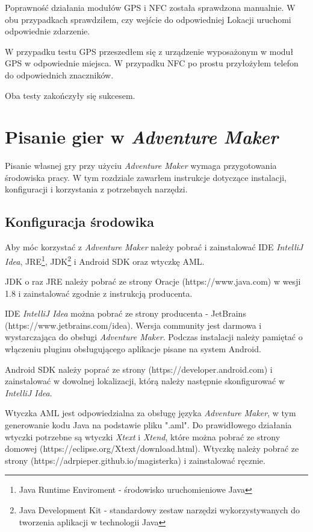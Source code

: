 \documentclass[openright]{xmgr}
\begin{document}
Poprawność działania modułów GPS i NFC została sprawdzona manualnie. W obu przypadkach sprawdziłem, czy wejście do odpowiedniej Lokacji uruchomi odpowiednie zdarzenie.

W przypadku testu GPS przeszedłem się z urządzenie wyposażonym w moduł GPS w odpowiednie miejsca. W przypadku NFC po prostu przyłożyłem telefon do odpowiednich znaczników. 

Oba testy zakończyły się sukcesem.  

\chapter{Pisanie gier w \textit{Adventure Maker}}
Pisanie własnej gry przy użyciu \textit{Adventure Maker} wymaga przygotowania środowiska pracy. W tym rozdziale zawarłem instrukcje dotyczące instalacji, konfiguracji i korzystania z potrzebnych narzędzi. 

\section{Konfiguracja środowika}

Aby móc korzystać z \textit{Adventure Maker} należy pobrać i zainstalować IDE \textit{IntelliJ Idea}, JRE\footnote{Java Runtime Enviroment - środowisko uruchomieniowe Java}, JDK\footnote{Java Development Kit - standardowy zestaw narzędzi wykorzystywanych do tworzenia aplikacji w technologii Java} i Android SDK oraz wtyczkę AML.

JDK o raz JRE należy pobrać ze strony Oracje (https://www.java.com) w wesji 1.8 i zainstalować zgodnie z instrukcją producenta.

IDE \textit{IntelliJ Idea} można pobrać ze strony producenta - JetBrains (https://www.jetbrains.com/idea). Wersja community jest darmowa i wystarczająca do obsługi \textit{Adventure Maker}. Podczas instalacji należy pamiętać o włączeniu pluginu obsługującego aplikacje pisane na system Android.

Android SDK  należy poprać ze strony (https://developer.android.com) i zainstalować w dowolnej lokalizacji, którą należy następnie skonfigurować w \textit{IntelliJ Idea}.

Wtyczka AML jest odpowiedzialna za obsługę języka \textit{Adventure Maker}, w tym generowanie kodu Java na podstawie pliku ".aml". Do prawidłowego działania wtyczki potrzebne są wtyczki \textit{Xtext} i \textit{Xtend}, które można pobrać ze strony domowej (https://eclipse.org/Xtext/download.html).
Wtyczkę należy pobrać ze strony (https://adrpieper.github.io/magisterka) i zainstalować ręcznie.
\end{document}
